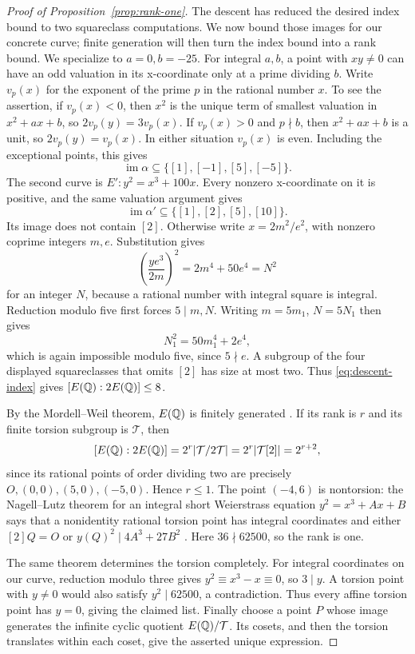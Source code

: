 \begin{proof}[Proof of Proposition~\ref{prop:rank-one}]
The descent has reduced the desired index bound to two squareclass
computations. We now bound those images for our concrete curve;
finite generation will then turn the index bound into a rank bound.
We specialize to \(a=0,b=-25\).  For integral \(a,b\), a
point with \(xy\ne0\) can have an odd valuation in its
x-coordinate only at a prime dividing \(b\).  Write \(v_p(x)\)
for the exponent of the prime \(p\) in the rational number \(x\).
To see the assertion, if
\(v_p(x)<0\), then \(x^2\) is the unique term of smallest
valuation in \(x^2+ax+b\), so
\(2v_p(y)=3v_p(x)\).  If \(v_p(x)>0\) and \(p\nmid b\),
then \(x^2+ax+b\) is a unit, so \(2v_p(y)=v_p(x)\).
In either situation \(v_p(x)\) is even.  Including the
exceptional points, this gives
\[
 \operatorname{im}\alpha\subseteq\{[1],[-1],[5],[-5]\}.
\]
The second curve is \(E':y^2=x^3+100x\).  Every nonzero
x-coordinate on it is positive, and the same valuation argument gives
\[
 \operatorname{im}\alpha'\subseteq\{[1],[2],[5],[10]\}.
\]
Its image does not contain \([2]\).  Otherwise write
\(x=2m^2/e^2\), with nonzero coprime integers \(m,e\).
Substitution gives
\[
 \left(\frac{ye^3}{2m}\right)^2=2m^4+50e^4=N^2
\]
for an integer \(N\), because a rational number with integral
square is integral.  Reduction modulo five first forces
\(5\mid m,N\).  Writing \(m=5m_1\), \(N=5N_1\) then gives
\[
 N_1^2=50m_1^4+2e^4,
\]
which is again impossible modulo five, since \(5\nmid e\).
A subgroup of the four displayed squareclasses that omits \([2]\)
has size at most two.  Thus \eqref{eq:descent-index} gives
\([E(\mathbb Q):2E(\mathbb Q)]\le8\).

By the Mordell--Weil theorem, \(E(\mathbb Q)\) is finitely generated
\cite[Chapter~VIII, Theorem~4.1]{silverman}.  If its rank is \(r\)
and its finite torsion subgroup is \(\mathcal T\), then
\[
 [E(\mathbb Q):2E(\mathbb Q)]
   =2^r|\mathcal T/2\mathcal T|
   =2^r|\mathcal T[2]|=2^{r+2},
\]
since its rational points of order dividing two are precisely
\(O,(0,0),(5,0),(-5,0)\).  Hence \(r\le1\).
The point \((-4,6)\) is nontorsion: the Nagell--Lutz theorem
for an integral short Weierstrass equation \(y^2=x^3+Ax+B\)
says that a nonidentity
rational torsion point has integral coordinates and either
\([2]Q=O\) or \(y(Q)^2\mid4A^3+27B^2\)
\cite[Chapter~VIII, Corollary~7.2]{silverman}.
Here \(36\nmid62500\), so the rank is one.

The same theorem determines the torsion completely.  For integral
coordinates on our curve, reduction modulo three gives
\(y^2\equiv x^3-x\equiv0\), so \(3\mid y\).
A torsion point with \(y\ne0\) would also satisfy
\(y^2\mid62500\), a contradiction.  Thus every affine torsion
point has \(y=0\), giving the claimed list.  Finally choose a
point \(P\) whose image generates the infinite cyclic quotient
\(E(\mathbb Q)/\mathcal T\).  Its cosets, and then the torsion
translates within each coset, give the asserted unique expression.
\end{proof}
